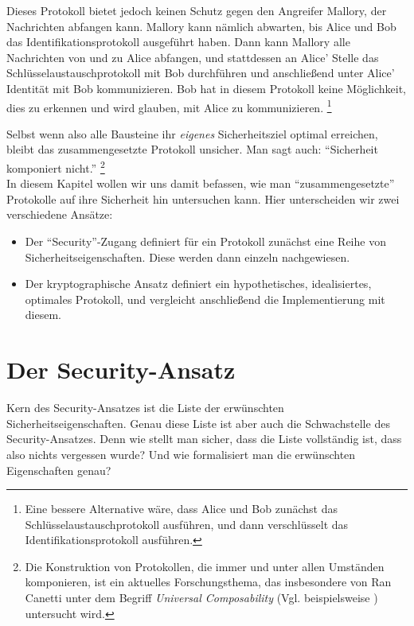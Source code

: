 \begin{beispiel}
	Dieses Protokoll bietet jedoch keinen Schutz gegen den Angreifer Mallory, der Nachrichten abfangen kann. Mallory kann nämlich abwarten, bis Alice und Bob das Identifikationsprotokoll ausgeführt haben. Dann kann Mallory alle Nachrichten von und zu Alice abfangen, und stattdessen an Alice' Stelle das Schlüsselaustauschprotokoll mit Bob durchführen und anschließend unter Alice' Identität mit Bob kommunizieren. Bob hat in diesem Protokoll keine Möglichkeit, dies zu erkennen und wird glauben, mit Alice zu kommunizieren.%
	\footnote{Eine bessere Alternative wäre, dass Alice und Bob zunächst das Schlüsselaustauschprotokoll ausführen, und dann verschlüsselt das Identifikationsprotokoll ausführen.}\\
\end{beispiel}

Selbst wenn also alle Bausteine ihr \emph{eigenes} Sicherheitsziel optimal erreichen, bleibt das zusammengesetzte Protokoll unsicher. Man sagt auch: "`Sicherheit komponiert nicht."'%
\footnote{Die Konstruktion von Protokollen, die immer und unter allen Umständen komponieren, ist ein aktuelles Forschungsthema, das insbesondere von Ran Canetti unter dem Begriff
\emph{Universal Composability} (Vgl. beispielsweise \cite{Canetti2001, Canetti2010}) untersucht wird.}
\\

In diesem Kapitel wollen wir uns damit befassen, wie man "`zusammengesetzte"' Protokolle auf ihre Sicherheit hin untersuchen kann. Hier unterscheiden wir zwei verschiedene Ansätze:
\begin{itemize}
	\item Der "`Security"'-Zugang definiert für ein Protokoll zunächst eine Reihe von Sicherheitseigenschaften. Diese werden dann einzeln nachgewiesen.
	\item Der kryptographische Ansatz definiert ein hypothetisches, idealisiertes, optimales Protokoll, und vergleicht anschließend die Implementierung mit diesem.
\end{itemize}

\section{Der Security-Ansatz}

Kern des Security-Ansatzes ist die Liste der erwünschten Sicherheitseigenschaften. Genau diese Liste ist aber auch die Schwachstelle des Security-Ansatzes.
Denn wie stellt man sicher, dass die Liste vollständig ist, dass also nichts vergessen wurde?
Und wie formalisiert man die erwünschten Eigenschaften genau?

